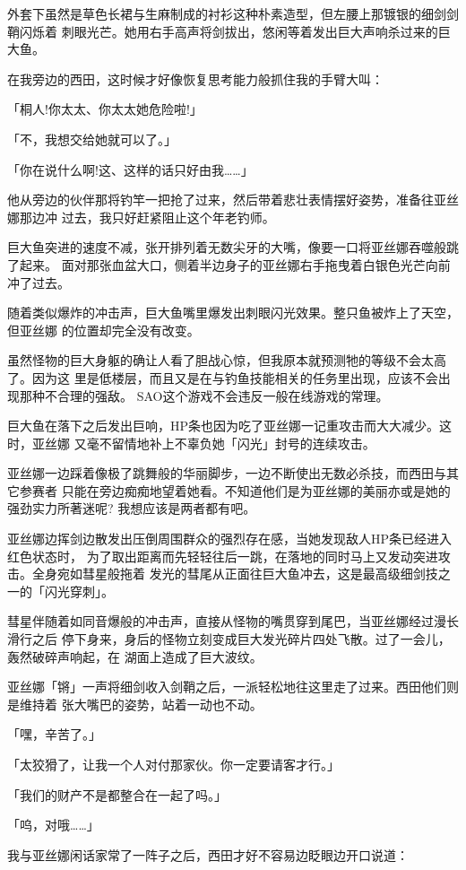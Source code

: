\documentclass[11pt]{book}
\begin{document}
外套下虽然是草色长裙与生麻制成的衬衫这种朴素造型，但左腰上那镀银的细剑剑鞘闪烁着
刺眼光芒。她用右手高声将剑拔出，悠闲等着发出巨大声响杀过来的巨大鱼。

在我旁边的西田，这时候才好像恢复思考能力般抓住我的手臂大叫：

「桐人!你太太、你太太她危险啦!」

「不，我想交给她就可以了。」

「你在说什么啊!这、这样的话只好由我……」

他从旁边的伙伴那将钓竿一把抢了过来，然后带着悲壮表情摆好姿势，准备往亚丝娜那边冲
过去，我只好赶紧阻止这个年老钓师。

巨大鱼突进的速度不减，张开排列着无数尖牙的大嘴，像要一口将亚丝娜吞噬般跳了起来。
面对那张血盆大口，侧着半边身子的亚丝娜右手拖曳着白银色光芒向前冲了过去。

随着类似爆炸的冲击声，巨大鱼嘴里爆发出刺眼闪光效果。整只鱼被炸上了天空，但亚丝娜
的位置却完全没有改变。

虽然怪物的巨大身躯的确让人看了胆战心惊，但我原本就预测牠的等级不会太高了。因为这
里是低楼层，而且又是在与钓鱼技能相关的任务里出现，应该不会出现那种不合理的强敌。
SAO这个游戏不会违反一般在线游戏的常理。

巨大鱼在落下之后发出巨响，HP条也因为吃了亚丝娜一记重攻击而大大减少。这时，亚丝娜
又毫不留情地补上不辜负她「闪光」封号的连续攻击。

亚丝娜一边踩着像极了跳舞般的华丽脚步，一边不断使出无数必杀技，而西田与其它参赛者
只能在旁边痴痴地望着她看。不知道他们是为亚丝娜的美丽亦或是她的强劲实力所著迷呢?
我想应该是两者都有吧。

亚丝娜边挥剑边散发出压倒周围群众的强烈存在感，当她发现敌人HP条已经进入红色状态时，
为了取出距离而先轻轻往后一跳，在落地的同时马上又发动突进攻击。全身宛如彗星般拖着
发光的彗尾从正面往巨大鱼冲去，这是最高级细剑技之一的「闪光穿刺」。

彗星伴随着如同音爆般的冲击声，直接从怪物的嘴贯穿到尾巴，当亚丝娜经过漫长滑行之后
停下身来，身后的怪物立刻变成巨大发光碎片四处飞散。过了一会儿，轰然破碎声响起，在
湖面上造成了巨大波纹。

亚丝娜「锵」一声将细剑收入剑鞘之后，一派轻松地往这里走了过来。西田他们则是维持着
张大嘴巴的姿势，站着一动也不动。

「嘿，辛苦了。」

「太狡猾了，让我一个人对付那家伙。你一定要请客才行。」

「我们的财产不是都整合在一起了吗。」

「呜，对哦……」

我与亚丝娜闲话家常了一阵子之后，西田才好不容易边眨眼边开口说道：
\end{document}
